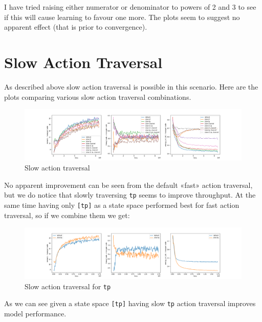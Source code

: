 I have tried raising either numerator or denominator 
to powers of 2 and 3 to see if this will cause learning
to favour one more. The plots seem to suggest no apparent
effect (that is prior to convergence). 

\section{Slow Action Traversal}

As described above slow action traversal is possible in 
this scenario. Here are the plots comparing various
slow action traversal combinations.

\begin{figure}[H]
\centering
\hspace*{-3.3cm}  
\includegraphics[scale=0.40]{plots/slow_action/slow_action_hypertuning_deep_q_SMALL.png}
  \caption{Slow action traversal}
\end{figure}

 No apparent
improvement can be seen from the default «fast»
action traversal, but we do notice that slowly 
traversing \texttt{tp} seems to improve throughput.
At the same time having only \texttt{[tp]} as a state space performed best for fast action traversal, so if we combine them we get: 

\begin{figure}[H]
\centering
\hspace*{-3.3cm}  
\includegraphics[scale=0.40]{plots/slow_action/slow_action__state_space_tp_hypertuning_deep_q_SMALL.png}
  \caption{Slow action traversal for \texttt{tp}}
\end{figure}

As we can see given a state space \texttt{[tp]} 
having slow \texttt{tp} action traversal improves
model performance.


